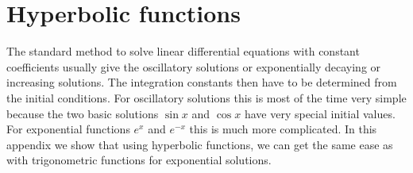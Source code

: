 %
%
%
\chapter{Hyperbolic functions}
The standard method to solve linear differential equations with constant
coefficients usually give the oscillatory solutions or exponentially
decaying or increasing solutions.
The integration constants then have to be determined from the initial
conditions.
For oscillatory solutions this is most of the time very simple because
the two basic solutions $\sin x$ and $\cos x$ have very special 
initial values.
For exponential functions $e^x$ and $e^{-x}$ this is much more
complicated.
In this appendix we show that using hyperbolic functions, we can
get the same ease as with trigonometric functions for exponential
solutions.



